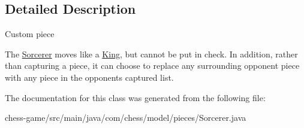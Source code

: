 \subsection{Detailed Description}
Custom piece

The \mbox{\hyperlink{classcom_1_1chess_1_1model_1_1pieces_1_1_sorcerer}{Sorcerer}} moves like a \mbox{\hyperlink{classcom_1_1chess_1_1model_1_1pieces_1_1_king}{King}}, but cannot be put in check. In addition, rather than capturing a piece, it can choose to replace any surrounding opponent piece with any piece in the opponent\textquotesingle{}s captured list. 

The documentation for this class was generated from the following file\+:\begin{DoxyCompactItemize}
\item 
chess-\/game/src/main/java/com/chess/model/pieces/Sorcerer.\+java\end{DoxyCompactItemize}
